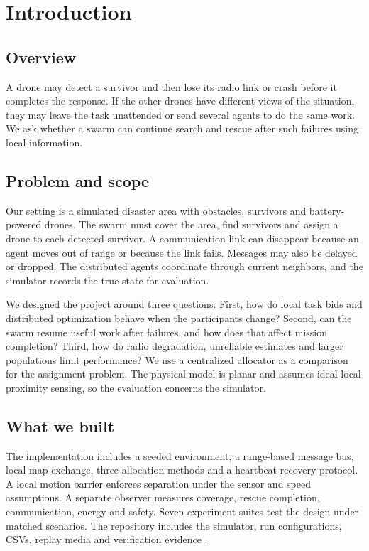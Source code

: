 \chapter{Introduction}
\section{Overview}
A drone may detect a survivor and then lose its radio link or crash before it completes the response. If the other drones have different views of the situation, they may leave the task unattended or send several agents to do the same work. We ask whether a swarm can continue search and rescue after such failures using local information.

\section{Problem and scope}
Our setting is a simulated disaster area with obstacles, survivors and battery-powered drones. The swarm must cover the area, find survivors and assign a drone to each detected survivor. A communication link can disappear because an agent moves out of range or because the link fails. Messages may also be delayed or dropped. The distributed agents coordinate through current neighbors, and the simulator records the true state for evaluation.

We designed the project around three questions. First, how do local task bids and distributed optimization behave when the participants change? Second, can the swarm resume useful work after failures, and how does that affect mission completion? Third, how do radio degradation, unreliable estimates and larger populations limit performance? We use a centralized allocator as a comparison for the assignment problem. The physical model is planar and assumes ideal local proximity sensing, so the evaluation concerns the simulator.

\section{What we built}
The implementation includes a seeded environment, a range-based message bus, local map exchange, three allocation methods and a heartbeat recovery protocol. A local motion barrier enforces separation under the sensor and speed assumptions. A separate observer measures coverage, rescue completion, communication, energy and safety. Seven experiment suites test the design under matched scenarios. The repository includes the simulator, run configurations, CSVs, replay media and verification evidence \cite{project}.

